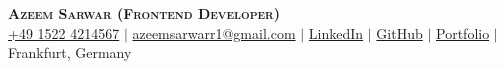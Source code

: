 

\begin{center}
    \textbf{\Huge \scshape Azeem Sarwar \small (Frontend Developer)} \\ \vspace{3pt}
    \small
    \faMobile \hspace{.5pt} \href{tel:004915224214567}{+49 1522 4214567}
    $|$
    \faAt \hspace{.5pt} \href{mailto:azeemsarwarr1@gmail.com}{azeemsarwarr1@gmail.com}
    $|$
    \faLinkedinSquare \hspace{.5pt} \href{https://www.linkedin.com/in/azeemsarwarr}{LinkedIn}
    $|$
    \faGithub \hspace{.5pt} \href{https://github.com/arasgungore}{GitHub}
    $|$
    \faGlobe \hspace{.5pt} \href{https://azeemsarwar.de}{Portfolio}
    $|$
    \faMapMarker \hspace{.5pt} {Frankfurt, Germany}
\end{center}